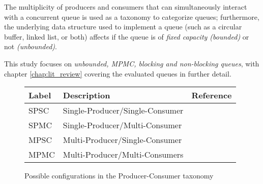 The multiplicity of producers and
consumers that can simultaneously interact with a concurrent queue is used as a
taxonomy to categorize queues;
furthermore, the underlying data structure used to implement a queue (such as a
circular buffer, linked list, or both) affects if the queue is of \emph{fixed
capacity (bounded)} or not \emph{(unbounded)}. 

This study focuses on \emph{unbounded, MPMC, blocking and
non-blocking queues}, with chapter \ref{chap:lit_review} covering the evaluated
queues in further detail.

\begin{figure}[h]\centering
\caption{Possible configurations in the Producer-Consumer taxonomy}\label{tab:producer_consumer}
    \begin{tabular}{lll}
        \hline
        Label & Description & Reference \\ \hline
        SPSC & Single-Producer/Single-Consumer &~\citep{aldinucci2012efficient} \\
        SPMC & Single-Producer/Multi-Consumer &~\citep{arnautov2017ffq} \\
        MPSC & Multi-Producer/Single-Consumer & \\
        MPMC & Multi-Producer/Multi-Consumers &~\citep{michael1996simple,valois1994queues,hoffman2007baskets}\\ \hline
    \end{tabular}        
\end{figure}

